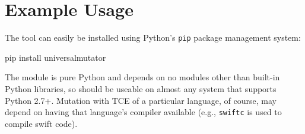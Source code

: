 \section{Example Usage}

The tool can easily be installed using Python's {\tt pip} package management system:

\begin{code}
pip install universalmutator
\end{code}

The module is pure Python and depends on no modules other than built-in Python libraries, so should be useable on almost any system that supports Python 2.7+.  Mutation with TCE of a particular language, of course, may depend on having that language's compiler available (e.g., {\tt swiftc} is used to compile swift code).